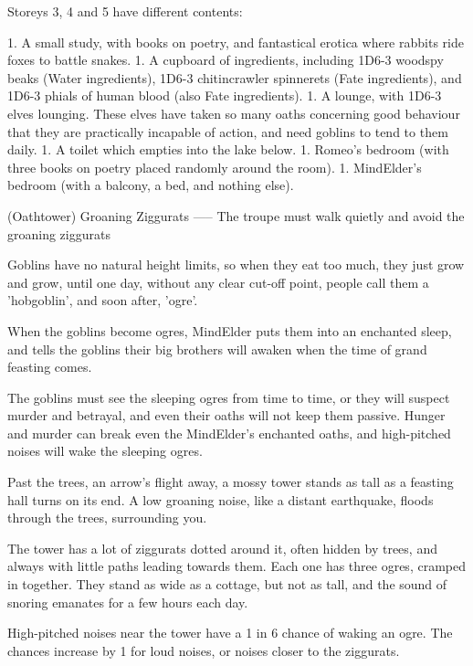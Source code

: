 Storeys 3, 4 and 5 have different contents:

\begin{dlist}
1. A small study, with books on poetry, and fantastical erotica where rabbits ride foxes to battle snakes.
1. A cupboard of \glspl{ingredient}, including 1D6-3 woodspy beaks (Water \glspl{ingredient}), 1D6-3 \gls{chitincrawler} spinnerets (Fate \glspl{ingredient}), and 1D6-3 phials of human blood (also Fate \glspl{ingredient}).
1. A lounge, with 1D6-3 elves lounging.  These elves have taken so many oaths concerning good behaviour that they are practically incapable of action, and need goblins to tend to them daily.
1. A toilet which empties into the lake below.
1. Romeo's bedroom (with three books on poetry placed randomly around the room).
1. MindElder's bedroom (with a balcony, a bed, and nothing else).
\end{dlist}

(Oathtower) Groaning Ziggurats
-----
{The troupe must walk quietly and avoid the groaning ziggurats}

Goblins have no natural height limits, so when they eat too much, they just grow and grow, until one day, without any clear cut-off point, people call them a 'hobgoblin', and soon after, 'ogre'.

When the goblins become ogres, MindElder puts them into an enchanted sleep, and tells the goblins their big brothers will awaken when the time of grand feasting comes.

The goblins must see the sleeping ogres from time to time, or they will suspect murder and betrayal, and even their oaths will not keep them passive.
Hunger and murder can break even the MindElder's enchanted oaths, and high-pitched noises will wake the sleeping ogres.

\begin{boxtext}
  Past the trees, an arrow's flight away, a mossy tower stands as tall as a feasting hall turns on its end.
  A low groaning noise, like a distant earthquake, floods through the trees, surrounding you.
\end{boxtext}

The tower has a lot of ziggurats dotted around it, often hidden by trees, and always with little paths leading towards them.
Each one has three ogres, cramped in together.
They stand as wide as a cottage, but not as tall, and the sound of snoring emanates for a few hours each day.

High-pitched noises near the tower
have a 1 in 6 chance of waking an ogre.
The chances increase by 1 for loud noises, or noises closer to the ziggurats.

